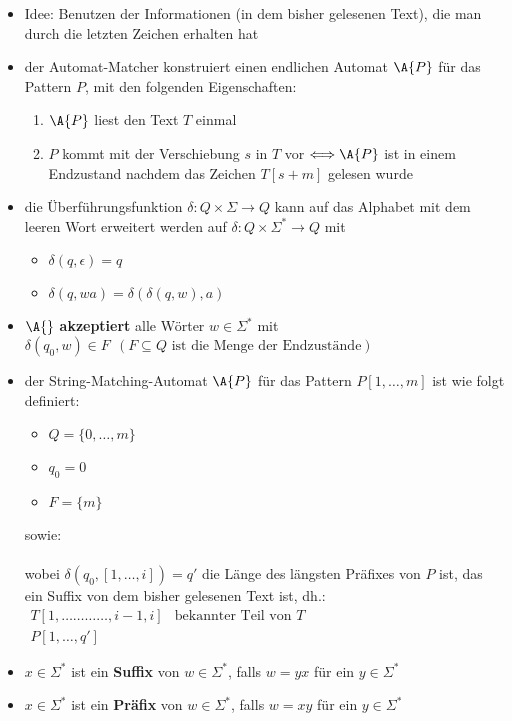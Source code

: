\vspace*{-0.75\baselineskip}\begin{itemize}[itemsep=-1pt]
	\item Idee: Benutzen der Informationen (in dem bisher gelesenen Text), die man durch die letzten Zeichen erhalten hat
	\item der Automat-Matcher konstruiert einen endlichen Automat $\A{P}$ für das Pattern $P$, mit den folgenden Eigenschaften:
		\begin{enumerate}
			\item $\A{P}$ liest den Text $T$ einmal
			\item $P$ kommt mit der Verschiebung $s$ in $T$ vor $\Longleftrightarrow \A{P}$ ist in einem Endzustand nachdem das Zeichen $T[s+m]$ gelesen wurde
		\end{enumerate}
	\item die Überführungsfunktion $\delta : Q \times \Sigma \rightarrow Q$ kann auf das Alphabet mit dem leeren Wort erweitert werden auf $\delta : Q\times \Sigma^{*} \rightarrow Q$ mit
		\begin{itemize}[itemsep=0pt]
			\item $\delta(q,\epsilon) = q$
			\item $\delta(q,wa) = \delta(\delta(q,w),a)$
		\end{itemize}
	\item $\A{}$ \textbf{akzeptiert} alle Wörter $w\in \Sigma^{*}$ mit $\delta(q_0,w)\in F~~(F\subseteq Q \text{ ist die Menge der Endzustände})$
	\item der String-Matching-Automat $\A{P}$ für das Pattern $P[1,\dots,m]$ ist wie folgt definiert:
		\begin{itemize}
			\item $Q=\{0,\dots,m\}$
			\item $q_0=0$
			\item $F=\{m\}$
		\end{itemize}
		sowie:\\
		\\
		wobei $\delta(q_0,[1,\dots,i])=q'$ die Länge des längsten Präfixes von $P$ ist, das ein Suffix von dem bisher gelesenen Text ist, dh.:\\
		$\begin{array}{rl}
			T[1,\dots\dots\dots\dots,i-1,i] & \text{bekannter Teil von }T\\
			P[1,\dots,q']
		\end{array}$
	\item $x\in \Sigma^{*}$ ist ein \textbf{Suffix} von $w\in\Sigma^{*}$, falls $w=yx$ für ein $y\in \Sigma^{*}$
	\item $x\in \Sigma^{*}$ ist ein \textbf{Präfix} von $w\in\Sigma^{*}$, falls $w=xy$ für ein $y\in \Sigma^{*}$
\end{itemize}
